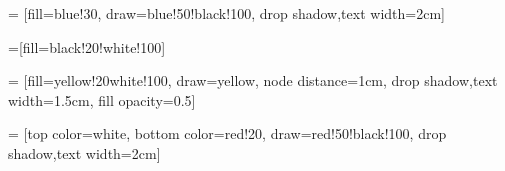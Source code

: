 \documentclass[../main.tex]{subfiles}
\begin{document}
\thispagestyle{empty}


 = [fill=blue!30, draw=blue!50!black!100, drop shadow,text width=2cm]

=[fill=black!20!white!100]

 = [fill=yellow!20white!100, draw=yellow, node distance=1cm, drop shadow,text width=1.5cm, fill opacity=0.5]

 = [top color=white, bottom color=red!20, draw=red!50!black!100, drop shadow,text width=2cm]
\end{document}
